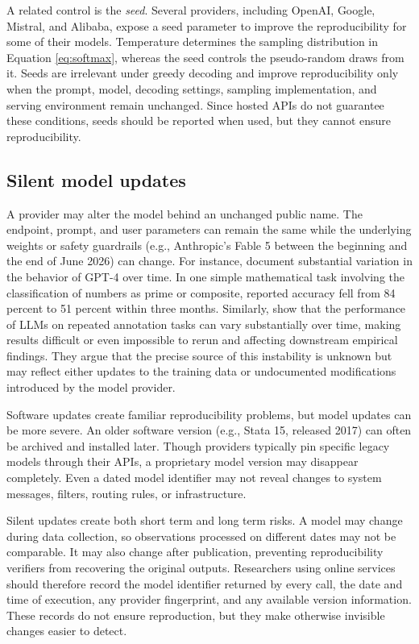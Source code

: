 \documentclass[11pt]{article}
\begin{document}
A related control is the \textit{seed}. Several providers, including OpenAI, Google, Mistral, and Alibaba, expose a seed parameter to improve the reproducibility for some of their models. Temperature determines the sampling distribution in Equation \eqref{eq:softmax}, whereas the seed controls the pseudo-random draws from it. Seeds are irrelevant under greedy decoding and improve reproducibility only when the prompt, model, decoding settings, sampling implementation, and serving environment remain unchanged. Since hosted APIs do not guarantee these conditions, seeds should be reported when used, but they cannot ensure reproducibility.\medskip

\subsection{Silent model updates}

A provider may alter the model behind an unchanged public name. The endpoint, prompt, and user parameters can remain the same while the underlying weights or safety guardrails (e.g., Anthropic's Fable 5 between the beginning and the end of June 2026) can change. For instance, \citet{chen2024} document substantial variation in the behavior of GPT-4 over time. In one simple mathematical task involving the classification of numbers as prime or composite, reported accuracy fell from 84 percent to 51 percent within three months. Similarly, \citet{barrie2024} show that the performance of LLMs on repeated annotation tasks can vary substantially over time, making results difficult or even impossible to rerun and affecting downstream empirical findings. They argue that the precise source of this instability is unknown but may reflect either updates to the training data or undocumented modifications introduced by the model provider.\medskip

Software updates create familiar reproducibility problems, but model updates can be more severe. An older software version (e.g., Stata 15, released 2017) can often be archived and installed later. Though providers typically pin specific legacy models through their APIs, a proprietary model version may disappear completely. Even a dated model identifier may not reveal changes to system messages, filters, routing rules, or infrastructure.\medskip

Silent updates create both short term and long term risks. A model may change during data collection, so observations processed on different dates may not be comparable. It may also change after publication, preventing reproducibility verifiers from recovering the original outputs. Researchers using online services should therefore record the model identifier returned by every call, the date and time of execution, any provider fingerprint, and any available version information. These records do not ensure reproduction, but they make otherwise invisible changes easier to detect.
\end{document}
